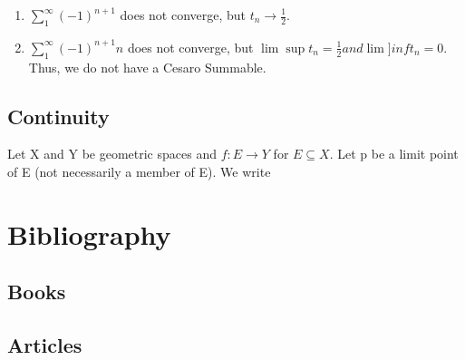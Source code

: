 \documentclass[11pt,fleqn]{book} %
\begin{document}
\begin{example}
	\begin{enumerate}[label = \alph*)]
		\item $\sum\limits^\infty_1 (-1)^{n+1}$ does not converge, but $t_n \rightarrow \frac{1}{2}$.
		\item $\sum\limits^\infty_1 (-1)^{n+1} n$ does not converge, but $\lim\sup t_n = \frac{1}{2} and \lim]inf t_n = 0$. Thus, we do not have a Cesaro Summable.
	\end{enumerate}
\end{example}

\section{Continuity}

\begin{definition}
	Let X and Y be geometric spaces and $f: E \rightarrow Y$ for $E \subseteq X$. Let p be a limit point of E (not necessarily a member of E). We write
\end{definition}

\chapter*{Bibliography}
\section*{Books}
\printbibliography[heading=bibempty,type=book]
\section*{Articles}
\printbibliography[heading=bibempty,type=article]


\cleardoublepage
{}
\setlength{\columnsep}{0.75cm}
\printindex

\end{document}
